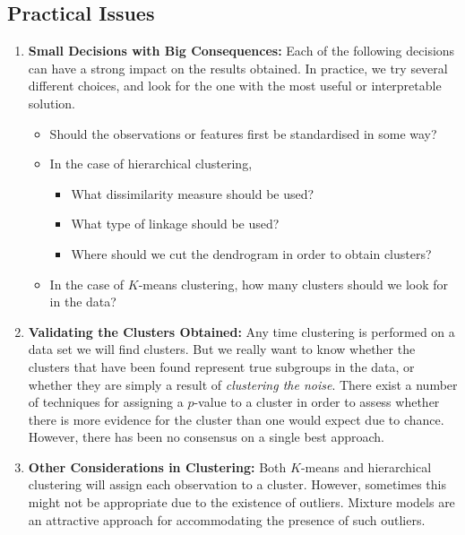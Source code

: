 \documentclass{article}
\begin{document}
\subsection{Practical Issues}

\begin{enumerate}
  \item \textbf{Small Decisions with Big Consequences:} Each of the following decisions can have a strong impact on the results obtained. In practice, we try several different choices, and look for the one with the most useful or interpretable solution.
    \begin{itemize}
      \item Should the observations or features first be standardised in some way?
      \item In the case of hierarchical clustering,
        \begin{itemize}
          \item What dissimilarity measure should be used?
          \item What type of linkage should be used?
          \item Where should we cut the dendrogram in order to obtain clusters?
        \end{itemize}
      \item In the case of $K$-means clustering, how many clusters should we look for in the data?
    \end{itemize}

  \item \textbf{Validating the Clusters Obtained:} Any time clustering is performed on a data set we will find clusters. But we really want to know whether the clusters that have been found represent true subgroups in the data, or whether they are simply a result of \emph{clustering the noise}. There exist a number of techniques for assigning a $p$-value to a cluster in order to assess whether there is more evidence for the cluster than one would expect due to chance. However, there has been no consensus on a single best approach.

  \item \textbf{Other Considerations in Clustering:} Both $K$-means and hierarchical clustering will assign each observation to a cluster. However, sometimes this might not be appropriate due to the existence of outliers. Mixture models are an attractive approach for accommodating the presence of such outliers.
\end{enumerate}
\end{document}
